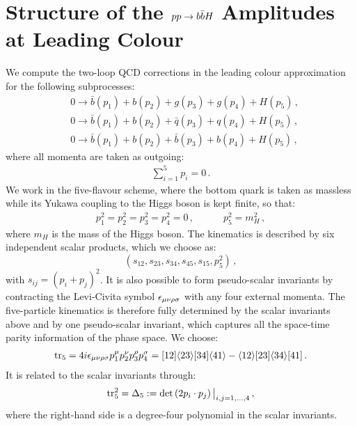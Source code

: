 \documentclass[main.tex]{subfiles}
\begin{document}
\section{Structure of the $pp\to b\bar{b}H$ Amplitudes at Leading Colour}
\label{Hbbsec:amp}
We compute the two-loop QCD corrections in the leading colour approximation for the following subprocesses:
\begin{align} \label{eq:subprocesses}
& 0 \rightarrow \bar{b}(p_1) + b(p_2) + g(p_3) + g(p_4) + H(p_5)\,, \\
& 0 \rightarrow \bar{b}(p_1) + b(p_2) + \bar{q}(p_3) + q(p_4) + H(p_5)\,, \label{eq:subprocessqq} \\
& 0 \rightarrow \bar{b}(p_1) + b(p_2) + \bar{b}(p_3) + b(p_4) + H(p_5) \,, \label{eq:subprocessbb}
\end{align}
where all momenta are taken as outgoing:
\begin{align}
\sum_{i=1}^5 p_i = 0\,.
\end{align}
We work in the five-flavour scheme, where the bottom quark is taken as massless while its Yukawa coupling to the Higgs boson is kept finite, so that:
\begin{align}
p_1^2=p_2^2=p_3^2=p_4^2=0\,, \qquad \quad p_5^2=m_H^2\,, 
\end{align}
where $m_H$ is the mass of the Higgs boson. The kinematics is described by six independent scalar products, which we choose as:
\begin{equation}
 (s_{12},s_{23},s_{34},s_{45},s_{15},p_5^2) \,, \nonumber
\end{equation}
with $s_{ij} = (p_i + p_j)^2$. It is also possible to form pseudo-scalar invariants by contracting the Levi-Civita symbol $\epsilon_{\mu \nu \rho \sigma}$ with any four external momenta. The five-particle kinematics is therefore fully determined by the scalar invariants above and by one pseudo-scalar invariant, which captures all the space-time parity information of the phase space. We choose:
\begin{align} \label{eq:tr5}
\text{tr}_5 = 4 i \epsilon_{\mu \nu \rho \sigma} p_1^{\mu} p_2^{\nu} p_3^{\rho} p_4^{\sigma} = [12] \langle23\rangle [34] \langle41\rangle - \langle12\rangle [23] \langle34\rangle [41] \,.
\end{align}
It is related to the scalar invariants through:
\begin{align} \label{eq:tr5squared}
\operatorname{\rm tr}_5^2 =  \Delta_5 := \text{det}\left(2 p_i \cdot p_j \right)\bigl|_{i,j=1,\ldots,4} \,,
\end{align}
where the right-hand side is a degree-four polynomial in the scalar invariants.
\end{document}
